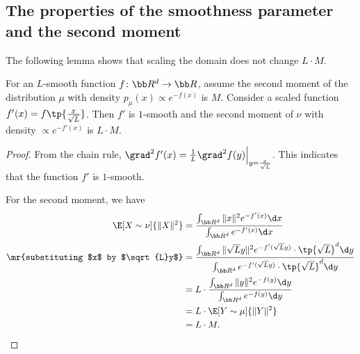 \subsection{The properties of the smoothness parameter and the second moment}
The following lemma shows that scaling the domain does not change $L\cdot M$.
\begin{lemma}\label{lem:LM}
    For an $L$-smooth function $f\colon \bb R^d\to \bb R$, assume the second moment of the distribution $\mu$ with density $p_\mu(x)\propto e^{-f(x)}$ is $M$. Consider a scaled function $f'(x)=f\tp{\frac{x}{\sqrt{L}}}$. Then $f'$ is $1$-smooth and the second moment of $\nu$ with density $\propto e^{-f'(x)}$ is $L\cdot M$.
\end{lemma}
\begin{proof}
    From the chain rule, $\grad^2 f'(x) = \frac{1}{L} \grad^2 f(y)\Big|_{y=\frac{x}{\sqrt{L}}}$. This indicates that the function $f'$ is $1$-smooth. 

    For the second moment, we have
    \begin{align*}
        \E[X\sim \nu]{\|X\|^2} &= \frac{\int_{\bb R^d} \|x\|^2 e^{-f'(x)}\d x}{\int_{\bb R^d} e^{-f'(x)}\d x}\\
        \mr{substituting $x$ by $\sqrt{L}y$}&= \frac{\int_{\bb R^d} \|\sqrt{L}y\|^2 e^{-f'(\sqrt{L}y)}\cdot \tp{\sqrt{L}}^d \d y}{\int_{\bb R^d} e^{-f'(\sqrt{L}y)}\cdot \tp{\sqrt{L}}^d\d y}\\
        &=L\cdot \frac{\int_{\bb R^d} \|y\|^2 e^{-f(y)}\d y}{\int_{\bb R^d} e^{-f(y)}\d y}\\
        &=L\cdot \E[Y\sim \mu]{\|Y\|^2} \\
        &=L\cdot M.
    \end{align*}
\end{proof}

